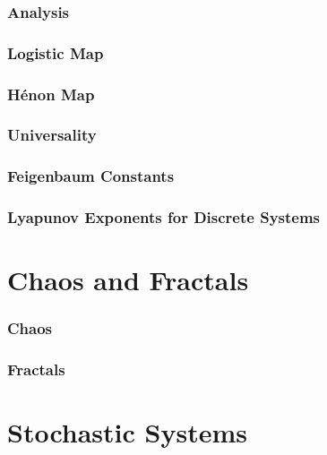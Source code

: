\documentclass[a4paper]{article}
\numberwithin{equation}{section}
\numberwithin{figure}{section}
\numberwithin{table}{section}
\theoremstyle{remark}
\begin{document}
\section{Analysis}{\label{sec:dds}}


\section{Logistic Map}{\label{sec:lm}}


\section{H\'enon Map}{\label{sec:hm}}


\section{Universality}


\section{Feigenbaum Constants}


\section{Lyapunov Exponents for Discrete Systems}{\label{sec:ledds}}


\newpage
\part{Chaos and Fractals}

\section{Chaos}


\section{Fractals}


\newpage
\part{Stochastic Systems}

\end{document}
